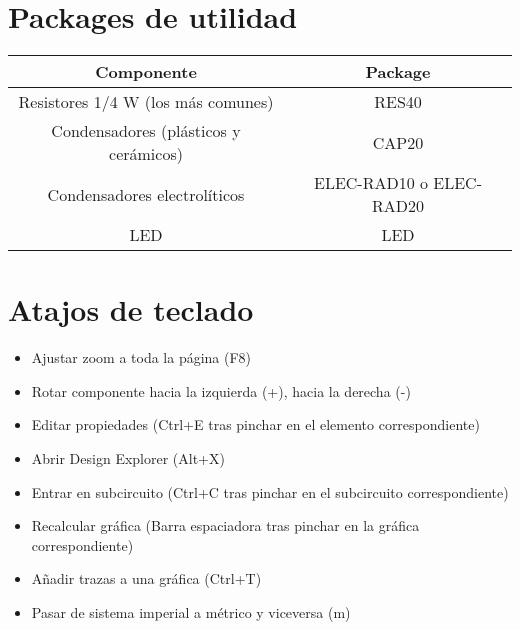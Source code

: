 \appendix

\section{Packages de utilidad}


	\begin{tabular}{|c|c|}
		\hline
		\textbf{Componente} & \textbf{Package}\\
		\hline
		Resistores 1/4 W (los más comunes) & RES40\\
		\hline
		Condensadores (plásticos y cerámicos) & CAP20\\
		\hline
		Condensadores electrolíticos & ELEC-RAD10 o ELEC-RAD20\\
		\hline
		LED & LED\\
		\hline
	\end{tabular}

\section{Atajos de teclado}

	\begin{itemize}
		\item Ajustar zoom a toda la página (F8)
		\item Rotar componente hacia la izquierda (+), hacia la derecha (-)
		\item Editar propiedades (Ctrl+E tras pinchar en el elemento correspondiente)
		\item Abrir Design Explorer (Alt+X)
		\item Entrar en subcircuito (Ctrl+C tras pinchar en el subcircuito correspondiente)
		\item Recalcular gráfica (Barra espaciadora tras pinchar en la gráfica correspondiente)
		\item Añadir trazas a una gráfica (Ctrl+T)
		\item Pasar de sistema imperial a métrico y viceversa (m)

		
	\end{itemize}

